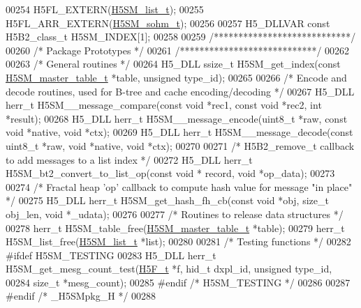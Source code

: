 \begin{DoxyCode}
00254 H5FL\_EXTERN(\hyperlink{struct_h5_s_m__list__t}{H5SM\_list\_t});
00255 H5FL\_ARR\_EXTERN(\hyperlink{struct_h5_s_m__sohm__t}{H5SM\_sohm\_t});
00256 
00257 H5\_DLLVAR \textcolor{keyword}{const} H5B2\_class\_t H5SM\_INDEX[1];
00258 
00259 \textcolor{comment}{/****************************/}
00260 \textcolor{comment}{/* Package Prototypes       */}
00261 \textcolor{comment}{/****************************/}
00262 
00263 \textcolor{comment}{/* General routines */}
00264 H5\_DLL ssize\_t H5SM\_get\_index(\textcolor{keyword}{const} \hyperlink{struct_h5_s_m__master__table__t}{H5SM\_master\_table\_t} *table, \textcolor{keywordtype}{unsigned} type\_id);
00265 
00266 \textcolor{comment}{/* Encode and decode routines, used for B-tree and cache encoding/decoding */}
00267 H5\_DLL herr\_t H5SM\_\_message\_compare(\textcolor{keyword}{const} \textcolor{keywordtype}{void} *rec1, \textcolor{keyword}{const} \textcolor{keywordtype}{void} *rec2, \textcolor{keywordtype}{int} *result);
00268 H5\_DLL herr\_t H5SM\_\_message\_encode(uint8\_t *raw, \textcolor{keyword}{const} \textcolor{keywordtype}{void} *native, \textcolor{keywordtype}{void} *ctx);
00269 H5\_DLL herr\_t H5SM\_\_message\_decode(\textcolor{keyword}{const} uint8\_t *raw, \textcolor{keywordtype}{void} *native, \textcolor{keywordtype}{void} *ctx);
00270 
00271 \textcolor{comment}{/* H5B2\_remove\_t callback to add messages to a list index */}
00272 H5\_DLL herr\_t H5SM\_bt2\_convert\_to\_list\_op(\textcolor{keyword}{const} \textcolor{keywordtype}{void} * record, \textcolor{keywordtype}{void} *op\_data);
00273 
00274 \textcolor{comment}{/* Fractal heap 'op' callback to compute hash value for message "in place" */}
00275 H5\_DLL herr\_t H5SM\_get\_hash\_fh\_cb(\textcolor{keyword}{const} \textcolor{keywordtype}{void} *obj, \textcolor{keywordtype}{size\_t} obj\_len, \textcolor{keywordtype}{void} *\_udata);
00276 
00277 \textcolor{comment}{/* Routines to release data structures */}
00278 herr\_t H5SM\_table\_free(\hyperlink{struct_h5_s_m__master__table__t}{H5SM\_master\_table\_t} *table);
00279 herr\_t H5SM\_list\_free(\hyperlink{struct_h5_s_m__list__t}{H5SM\_list\_t} *list);
00280 
00281 \textcolor{comment}{/* Testing functions */}
00282 \textcolor{preprocessor}{#ifdef H5SM\_TESTING}
00283 H5\_DLL herr\_t H5SM\_get\_mesg\_count\_test(\hyperlink{struct_h5_f__t}{H5F\_t} *f, hid\_t dxpl\_id, \textcolor{keywordtype}{unsigned} type\_id,
00284     \textcolor{keywordtype}{size\_t} *mesg\_count);
00285 \textcolor{preprocessor}{#endif }\textcolor{comment}{/* H5SM\_TESTING */}\textcolor{preprocessor}{}
00286 
00287 \textcolor{preprocessor}{#endif }\textcolor{comment}{/* \_H5SMpkg\_H */}\textcolor{preprocessor}{}
00288 
\end{DoxyCode}
